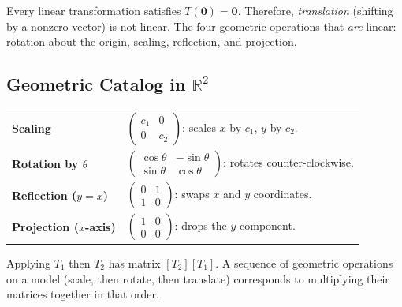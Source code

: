 \begin{remark*}
Every linear transformation satisfies $T(\mathbf{0}) = \mathbf{0}$.
Therefore, \emph{translation} (shifting by a nonzero vector) is not linear.
The four geometric operations that \emph{are} linear: rotation about the origin,
scaling, reflection, and projection.
\end{remark*}

\subsection*{Geometric Catalog in $\mathbb{R}^2$}

\begin{tcolorbox}[colback=gray!6, colframe=gray!40, arc=2pt,
  left=6pt, right=6pt, top=4pt, bottom=4pt,
  title={\small\textbf{Standard Planar Transformations}},
  fonttitle=\small\bfseries]
\begin{tabular}{@{}p{}p{}@{}}
\textbf{Scaling}           & $\begin{pmatrix} c_1 & 0 \\ 0 & c_2 \end{pmatrix}$: scales $x$ by $c_1$, $y$ by $c_2$. \\[8pt]
\textbf{Rotation by $\theta$} & $\begin{pmatrix} \cos\theta & -\sin\theta \\ \sin\theta & \cos\theta \end{pmatrix}$: rotates counter-clockwise. \\[8pt]
\textbf{Reflection ($y=x$)} & $\begin{pmatrix} 0 & 1 \\ 1 & 0 \end{pmatrix}$: swaps $x$ and $y$ coordinates. \\[8pt]
\textbf{Projection ($x$-axis)} & $\begin{pmatrix} 1 & 0 \\ 0 & 0 \end{pmatrix}$: drops the $y$ component. \\
\end{tabular}
\end{tcolorbox}

\begin{remark*}
Applying $T_1$ then $T_2$ has matrix $[T_2][T_1]$.
A sequence of geometric operations on a model (scale, then rotate, then translate)
corresponds to multiplying their matrices together in that order.
\end{remark*}

